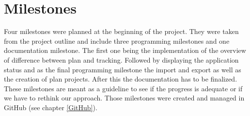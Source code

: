 \section{Milestones} \label{Milestones}
Four milestones were planned at the beginning of the project. They were taken from the project outline and include three programming milestones and one documentation milestone. The first one being the implementation of the overview of difference between plan and tracking. Followed by displaying the application status and as the final programming milestone the import and export as well as the creation of plan projects. After this the documentation has to be finalized. These milestones are meant as a guideline to see if the progress is adequate or if we have to rethink our approach. Those milestones were created and managed in GitHub (see chapter \ref{GitHub}). 